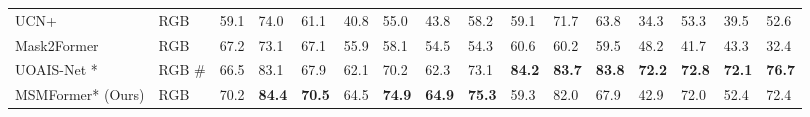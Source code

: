\documentclass[letterpaper, 10 pt, conference]{ieeeconf}
\begin{document}
\begin{table*}
{\begin{tabular}{|l|l|lllllll|lllllll|}
UCN+ \cite{xiang2020learning}                                                     & RGB                    & 59.1                  & 74.0                  & \multicolumn{1}{l|}{61.1}          & 40.8                  & 55.0                  & \multicolumn{1}{l|}{43.8}          & 58.2 & 59.1                  & 71.7                  & \multicolumn{1}{l|}{63.8}          & 34.3                  & 53.3         & \multicolumn{1}{l|}{39.5}          & 52.6 \\
Mask2Former \cite{cheng2022masked}                                           & RGB                    & 67.2                  & 73.1                  & \multicolumn{1}{l|}{67.1}          & 55.9                  & 58.1         & \multicolumn{1}{l|}{54.5}          & 54.3          & 60.6                  & 60.2                  & \multicolumn{1}{l|}{59.5}          & 48.2                  & 41.7                  & \multicolumn{1}{l|}{43.3}          & 32.4          \\

UOAIS-Net \cite{back2022unseen}*                                         & RGB \#                   & 66.5                           & 83.1                  & \multicolumn{1}{l|}{67.9}          & 62.1                           & 70.2                           & \multicolumn{1}{l|}{62.3}          & 73.1                           & \textbf{84.2}                  & \textbf{83.7}                  & \multicolumn{1}{l|}{\textbf{83.8}} & \textbf{72.2}                  & \textbf{72.8}                  & \multicolumn{1}{l|}{\textbf{72.1}} & \textbf{76.7}                  \\

MSMFormer* (Ours)                                  & RGB                    & 70.2                  & \textbf{84.4}                           & \multicolumn{1}{l|}{\textbf{70.5}} & 64.5                  & \textbf{74.9}                  & \multicolumn{1}{l|}{\textbf{64.9}} & \textbf{75.3}                  & 59.3                           & 82.0                           & \multicolumn{1}{l|}{67.9}          & 42.9                           & 72.0                           & \multicolumn{1}{l|}{52.4}          & 72.4                           \\ 


\end{tabular}}
\end{table*}
\end{document}
